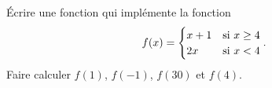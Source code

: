 
\begin{exercice}\label{exosmath-0173}

    Écrire une fonction qui implémente la fonction
    \begin{equation}
        f(x)=\begin{cases}
            x+1    &   \text{si \( x\geq 4\)}\\
            2x    &    \text{si \( x<4\)}
        \end{cases}.
    \end{equation}
    Faire calculer \( f(1)\), \( f(-1)\), \( f(30)\) et \( f(4)\).

\end{exercice}
